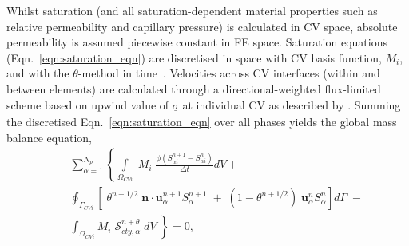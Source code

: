 \documentclass[preprint,authoryear,12pt]{elsarticle}
\newcommand{\PN}[2][error]{P$_{#1}$DG-P$_{#2}$}
\newcommand{\PNDG}[2][error]{P$_{#1}$DG-P$_{#2}$DG}
\begin{document}
\medskip
Whilst saturation (and all saturation-dependent material properties such as relative permeability and capillary pressure) is calculated in CV space, absolute permeability is assumed piecewise constant in FE space. Saturation equations (Eqn.~\ref{eqn:saturation_eqn}) are discretised in space with CV basis function, $M_{i}$, and with the $\theta$-method in time~\citep{gomes_book_2012}. Velocities across CV interfaces (within and between elements) are calculated through a directional-weighted flux-limited scheme based on upwind value of $\underline{\underline{\sigma}}$ at individual CV as described by \citet{gomes_2017}. Summing the discretised Eqn.~\ref{eqn:saturation_eqn} over all phases yields the global mass balance equation,
\begin{eqnarray}
 && \sum_{\alpha=1}^{N_{p}} \left\{\int\limits_{\Omega_{CVi}} \; M_{i} \; \frac{\phi\left(S_{\alpha i}^{n+1}-S_{\alpha i}^{n}\right)}{\Delta t} dV\right.  + \nonumber\\
 &&  \oint_{\Gamma_{CVi}} \left[\; \theta^{n+1/2}\; {\mathbf n}\cdot {\mathbf u}_{\alpha}^{n+1}S_{\alpha}^{n+1} \; + \; \left(1-\theta^{n+1/2}\right) \; {\mathbf u}_{\alpha}^{n}S_{\alpha}^{n}\right] d\Gamma \;- \nonumber\\
 &&  \left.\int_{\Omega_{CVi}} M_{i} \; \mathcal{S}_{cty,\alpha}^{n+\theta} \; dV\;\right\} =0,
\label{global_mass_balance}
\end{eqnarray}

\end{document}
